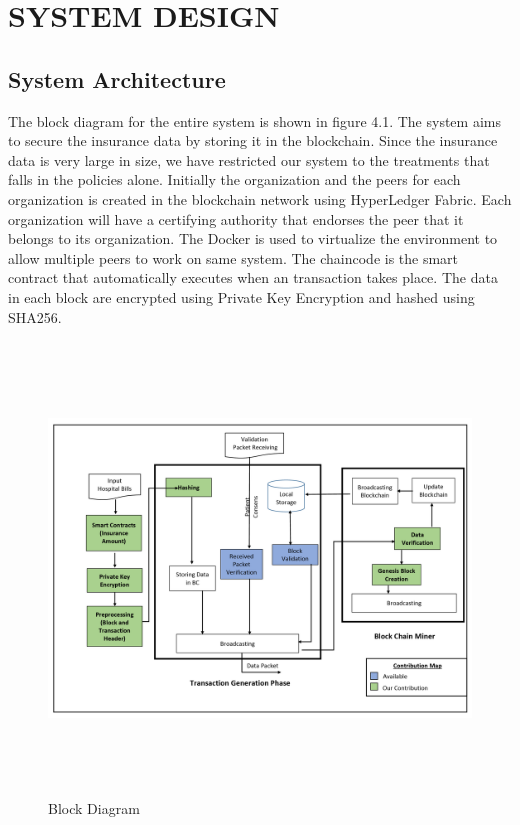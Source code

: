 
\chapter{SYSTEM DESIGN} %

\section{System Architecture}

The block diagram for the entire system is shown in figure 4.1. The
system aims to secure the insurance data by storing it in the blockchain. Since the insurance data is very large in size, we have restricted our system to the treatments that falls in the policies alone. Initially the organization and the peers for each organization is created in the blockchain network using HyperLedger Fabric. Each organization will have a certifying authority that endorses the peer that it belongs to its organization. The Docker is used to virtualize the environment to allow multiple peers to work on same system. The chaincode is the smart contract that automatically executes when an transaction takes place. The data in each block are encrypted using Private Key Encryption and hashed using SHA256. 
\newline
\newline
\newline
\newline
\newline
\newline
\newline
\newline
\newline



\begin{figure}[htb!]
  \centering
 \includegraphics[width = 15cm, height = 12cm, angle=90, scale=1.3]{Figures/Block-Diagram.png}
  \caption{Block Diagram}
  \label{StH}	
\end{figure}


